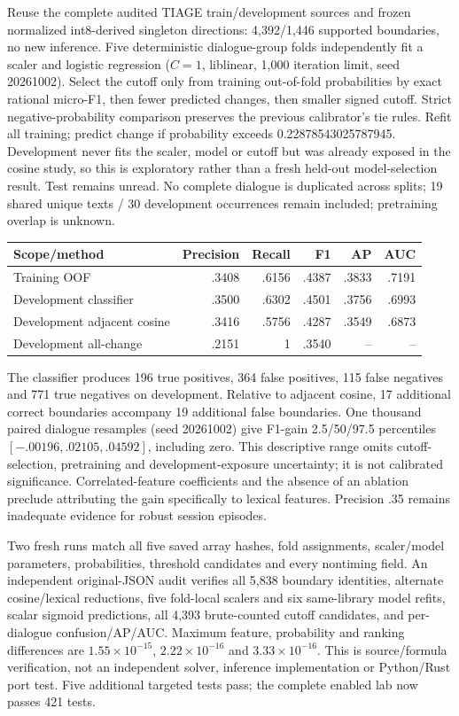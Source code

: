 \documentclass[11pt]{article}
\begin{document}
Reuse the complete audited TIAGE train/development sources and frozen normalized
int8-derived singleton directions: 4,392/1,446 supported boundaries, no new
inference. Five deterministic dialogue-group folds independently fit a scaler
and logistic regression ($C=1$, liblinear, 1,000 iteration limit, seed 20261002).
Select the cutoff only from training out-of-fold probabilities by exact rational
micro-F1, then fewer predicted changes, then smaller signed cutoff. Strict
negative-probability comparison preserves the previous calibrator's tie rules.
Refit all training; predict change if probability exceeds
0.22878543025787945. Development never fits the scaler, model or cutoff but was
already exposed in the cosine study, so this is exploratory rather than a fresh
held-out model-selection result. Test remains unread. No complete dialogue is
duplicated across splits; 19 shared unique texts / 30 development occurrences
remain included; pretraining overlap is unknown.

\begin{center}\small
\begin{tabular}{lrrrrr}
\toprule
Scope/method & Precision & Recall & F1 & AP & AUC\\
\midrule
Training OOF & .3408 & .6156 & .4387 & .3833 & .7191\\
Development classifier & .3500 & .6302 & .4501 & .3756 & .6993\\
Development adjacent cosine & .3416 & .5756 & .4287 & .3549 & .6873\\
Development all-change & .2151 & 1 & .3540 & -- & --\\
\bottomrule
\end{tabular}\end{center}
The classifier produces 196 true positives, 364 false positives, 115 false
negatives and 771 true negatives on development. Relative to adjacent cosine,
17 additional correct boundaries accompany 19 additional false boundaries.
One thousand paired dialogue resamples (seed 20261002) give F1-gain
2.5/50/97.5 percentiles $[-.00196,.02105,.04592]$, including zero. This descriptive
range omits cutoff-selection, pretraining and development-exposure uncertainty;
it is not calibrated significance. Correlated-feature coefficients and the
absence of an ablation preclude attributing the gain specifically to lexical
features. Precision .35 remains inadequate evidence for robust session episodes.

Two fresh runs match all five saved array hashes, fold assignments, scaler/model
parameters, probabilities, threshold candidates and every nontiming field.
An independent original-JSON audit verifies all 5,838 boundary identities,
alternate cosine/lexical reductions, five fold-local scalers and six same-library
model refits, scalar sigmoid predictions, all 4,393 brute-counted cutoff
candidates, and per-dialogue confusion/AP/AUC. Maximum feature, probability and
ranking differences are $1.55\times10^{-15}$, $2.22\times10^{-16}$ and
$3.33\times10^{-16}$. This is source/formula verification, not an independent
solver, inference implementation or Python/Rust port test. Five additional
targeted tests pass; the complete enabled lab now passes 421 tests.
\end{document}

